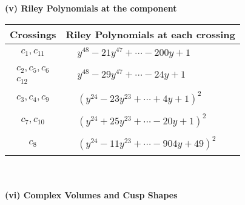 \documentclass[1p]{elsarticle_modified}
\theoremstyle{definition}
\begin{document}
\flushleft \textbf{(v) Riley Polynomials at the component}\newline \\
\begin{tabular}{m{50pt}|m{274pt}}
Crossings & \hspace{64pt}Riley Polynomials at each crossing \\
\hline $$\begin{aligned}c_{1},c_{11}\end{aligned}$$&$\begin{aligned}
&y^{48}-21 y^{47}+\cdots-200 y+1
\end{aligned}$\\
\hline $$\begin{aligned}c_{2},c_{5},c_{6}\\c_{12}\end{aligned}$$&$\begin{aligned}
&y^{48}-29 y^{47}+\cdots-24 y+1
\end{aligned}$\\
\hline $$\begin{aligned}c_{3},c_{4},c_{9}\end{aligned}$$&$\begin{aligned}
&(y^{24}-23 y^{23}+\cdots+4 y+1)^{2}
\end{aligned}$\\
\hline $$\begin{aligned}c_{7},c_{10}\end{aligned}$$&$\begin{aligned}
&(y^{24}+25 y^{23}+\cdots-20 y+1)^{2}
\end{aligned}$\\
\hline $$\begin{aligned}c_{8}\end{aligned}$$&$\begin{aligned}
&(y^{24}-11 y^{23}+\cdots-904 y+49)^{2}
\end{aligned}$\\
\hline
\end{tabular}\\~\\
\newpage\flushleft \textbf{(vi) Complex Volumes and Cusp Shapes}
\end{document}
